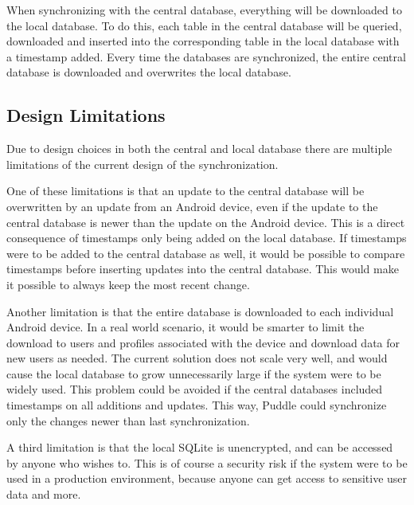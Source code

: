 When synchronizing with the central database, everything will be downloaded to the local database. To do this, each table in the central database will be queried, downloaded and inserted into the corresponding table in the local database with a timestamp added. Every time the databases are synchronized, the entire central database is downloaded and overwrites the local database.

\subsection{Design Limitations}
Due to design choices in both the central and local database there are multiple limitations of the current design of the synchronization.

One of these limitations is that an update to the central database will be overwritten by an update from an Android device, even if the update to the central database is newer than the update on the Android device. This is a direct consequence of timestamps only being added on the local database. If timestamps were to be added to the central database as well, it would be possible to compare timestamps before inserting updates into the central database. This would make it possible to always keep the most recent change.

Another limitation is that the entire database is downloaded to each individual Android device. In a real world scenario, it would be smarter to limit the download to users and profiles associated with the device and download data for new users as needed. The current solution does not scale very well, and would cause the local database to grow unnecessarily large if the system were to be widely used. This problem could be avoided if the central databases included timestamps on all additions and updates. This way, Puddle could synchronize only the changes newer than last synchronization. %

A third limitation is that the local SQLite is unencrypted, and can be accessed by anyone who wishes to. This is of course a security risk if the system were to be used in a production environment, because anyone can get access to sensitive user data and more.